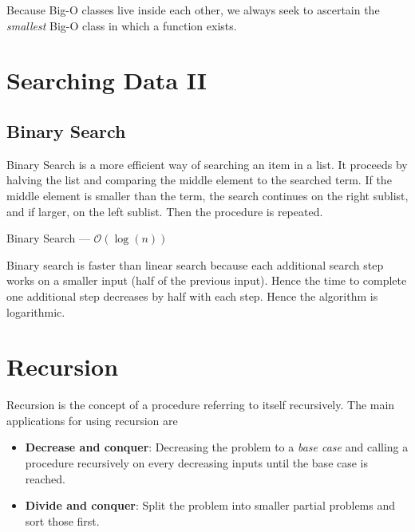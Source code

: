 Because Big-O classes live inside each other, we always seek to ascertain the \emph{smallest} Big-O class in which a function exists.

\section{Searching Data II}

\subsection{Binary Search}
Binary Search is a more efficient way of searching an item in a list. It proceeds by halving the list and comparing the middle element to the searched term. If the middle element is smaller than the term, the search continues on the right sublist, and if larger, on the left sublist. Then the procedure is repeated.

\begin{algorithm}[H]
	\caption{Binary Search --- \( \mathcal{O}(\log(n)) \)}\label{alg:binary}
	\begin{algorithmic}

		\Else{}
		\EndIf{}
		\EndWhile{}

		\EndFunction{}
	\end{algorithmic}
\end{algorithm}

Binary search is faster than linear search because each additional search step works on a smaller input (half of the previous input). Hence the time to complete one additional step decreases by half with each step. Hence the algorithm is logarithmic.



\section{Recursion}
Recursion is the concept of a procedure referring to itself recursively. The main applications for using recursion are
\begin{itemize}
	\item \textbf{Decrease and conquer}: Decreasing the problem to a \emph{base case} and calling a procedure recursively on every decreasing inputs until the base case is reached. 
	\item \textbf{Divide and conquer}: Split the problem into smaller partial problems and sort those first. 
\end{itemize}

